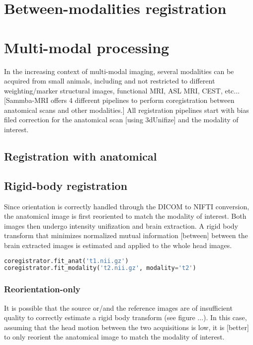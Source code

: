 \documentclass[utf8]{frontiersSCNS} %
\begin{document}
\section{Between-modalities registration}
\section{Multi-modal processing}
In the increasing context of multi-modal imaging, several modalities can be
acquired from small animals, including and not restricted to different weighting/marker
structural images, functional MRI, ASL MRI, CEST, etc...
[Sammba-MRI offers 4 different pipelines to perform coregistration
between anatomical scans and other modalities.]
All registration pipelines start with bias filed correction for the anatomical scan
[using 3dUnifize] and the modality of interest. 
\subsection{Registration with anatomical}
\subsection{Rigid-body registration}
Since orientation is correctly handled through the DICOM to NIFTI conversion,
the anatomical image is first reoriented to match the modality of interest.
Both images then undergo intensity unifization and brain extraction.
A rigid body
transform that minimizes normalized mutual information [between]
between the brain extracted images is estimated and applied to the whole head images.
\begin{lstlisting}[language=Python]
coregistrator.fit_anat('t1.nii.gz')
coregistrator.fit_modality('t2.nii.gz', modality='t2')
\end{lstlisting}

\subsubsection{Reorientation-only}
It is possible that the source or/and the reference
images are of insufficient quality to correctly estimate a rigid body transform
(see figure ...). In this case,
assuming that the head motion between the two acquisitions is low, it is [better]
to only reorient the anatomical image to match the modality of interest.
\end{document}
